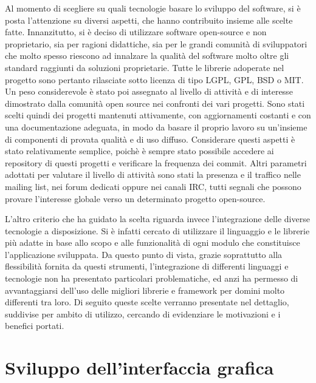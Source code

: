 \documentclass[12pt]{toptesi}
\begin{document}
Al momento di scegliere su quali tecnologie basare lo sviluppo del software, si è posta l'attenzione su diversi aspetti, che hanno contribuito insieme alle scelte fatte. Innanzitutto, si è deciso di utilizzare software open-source e non proprietario, sia per ragioni didattiche, sia per le grandi comunità di sviluppatori che molto spesso riescono ad innalzare la qualità del software molto oltre gli standard raggiunti da soluzioni proprietarie. Tutte le librerie adoperate nel progetto sono pertanto rilasciate sotto licenza di tipo LGPL, GPL, BSD o MIT. Un peso considerevole è stato poi assegnato al livello di attività e di interesse dimostrato dalla comunità open source nei confronti dei vari progetti. Sono stati scelti quindi dei progetti mantenuti attivamente, con aggiornamenti costanti e con una documentazione adeguata, in modo da basare il proprio lavoro su un'insieme di componenti di provata qualità e di uso diffuso. Considerare questi aspetti è stato relativamente semplice, poichè è sempre stato possibile accedere ai repository di questi progetti e verificare la frequenza dei commit. Altri parametri adottati per valutare il livello di attività sono stati la presenza e il traffico nelle mailing list, nei forum dedicati oppure nei canali IRC, tutti segnali che possono provare l'interesse globale verso un determinato progetto open-source.

L'altro criterio che ha guidato la scelta riguarda invece l'integrazione delle diverse tecnologie a disposizione. Si è infatti cercato di utilizzare il linguaggio e le librerie più adatte in base allo scopo e alle funzionalità di ogni modulo che constituisce l'applicazione sviluppata. Da questo punto di vista, grazie soprattutto alla flessibilità fornita da questi strumenti, l'integrazione di differenti linguaggi e tecnologie non ha presentato particolari problematiche, ed anzi ha permesso di avvantaggiarsi dell'uso delle migliori librerie e framework per domini molto differenti tra loro. Di seguito queste scelte verranno presentate nel dettaglio, suddivise per ambito di utilizzo, cercando di evidenziare le motivazioni e i benefici portati.

\section{Sviluppo dell'interfaccia grafica}
\end{document}
